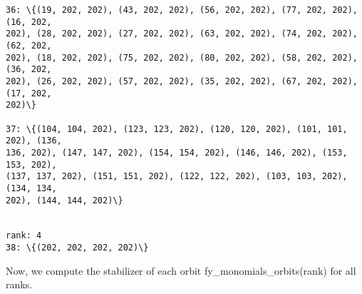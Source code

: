 \documentclass[11pt]{article}
\begin{document}
\begin{Verbatim}[commandchars=\\\{\}]
36: \{(19, 202, 202), (43, 202, 202), (56, 202, 202), (77, 202, 202), (16, 202,
202), (28, 202, 202), (27, 202, 202), (63, 202, 202), (74, 202, 202), (62, 202,
202), (18, 202, 202), (75, 202, 202), (80, 202, 202), (58, 202, 202), (36, 202,
202), (26, 202, 202), (57, 202, 202), (35, 202, 202), (67, 202, 202), (17, 202,
202)\}

37: \{(104, 104, 202), (123, 123, 202), (120, 120, 202), (101, 101, 202), (136,
136, 202), (147, 147, 202), (154, 154, 202), (146, 146, 202), (153, 153, 202),
(137, 137, 202), (151, 151, 202), (122, 122, 202), (103, 103, 202), (134, 134,
202), (144, 144, 202)\}


rank: 4
38: \{(202, 202, 202, 202)\}

    \end{Verbatim}

    Now, we compute the stabilizer of each orbit fy\_monomials\_orbits(rank)
for all ranks.
\end{document}
